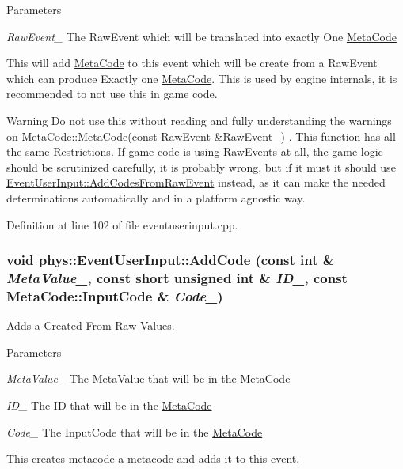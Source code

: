 \begin{DoxyParams}{Parameters}
\item[{\em RawEvent\_\-}]The RawEvent which will be translated into exactly One \hyperlink{classphys_1_1MetaCode}{MetaCode}\end{DoxyParams}
This will add \hyperlink{classphys_1_1MetaCode}{MetaCode} to this event which will be create from a RawEvent which can produce Exactly one \hyperlink{classphys_1_1MetaCode}{MetaCode}. This is used by engine internals, it is recommended to not use this in game code. \begin{DoxyWarning}{Warning}
Do not use this without reading and fully understanding the warnings on \hyperlink{classphys_1_1MetaCode_ad9a618b5cc6f9d0cf0a4bc4f47bf98e8}{MetaCode::MetaCode(const RawEvent \&RawEvent\_\-)} . This function has all the same Restrictions. If game code is using RawEvents at all, the game logic should be scrutinized carefully, it is probably wrong, but if it must it should use \hyperlink{classphys_1_1EventUserInput_a26a39a23deab9e54c140cc0a1cbbe6a9}{EventUserInput::AddCodesFromRawEvent} instead, as it can make the needed determinations automatically and in a platform agnostic way. 
\end{DoxyWarning}


Definition at line 102 of file eventuserinput.cpp.

\hypertarget{classphys_1_1EventUserInput_ac9d4d8372fad7d91a5508d9e612a10e9}{
\subsubsection[{AddCode}]{\setlength{\rightskip}{0pt plus 5cm}void phys::EventUserInput::AddCode (const int \& {\em MetaValue\_\-}, \/  const short unsigned int \& {\em ID\_\-}, \/  const {\bf MetaCode::InputCode} \& {\em Code\_\-})}}
\label{d7/df5/classphys_1_1EventUserInput_ac9d4d8372fad7d91a5508d9e612a10e9}


Adds a Created From Raw Values. 


\begin{DoxyParams}{Parameters}
\item[{\em MetaValue\_\-}]The MetaValue that will be in the \hyperlink{classphys_1_1MetaCode}{MetaCode} \item[{\em ID\_\-}]The ID that will be in the \hyperlink{classphys_1_1MetaCode}{MetaCode} \item[{\em Code\_\-}]The InputCode that will be in the \hyperlink{classphys_1_1MetaCode}{MetaCode}\end{DoxyParams}
This creates metacode a metacode and adds it to this event. 

